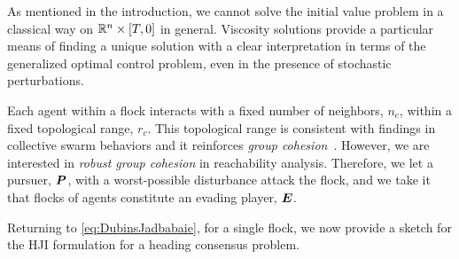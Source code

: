 As mentioned in the introduction, we cannot solve the initial value problem in a classical way on $\mathbb{R}^n \times [T, 0]$ in general. Viscosity solutions provide a particular means of finding a unique solution with a clear interpretation in terms of the generalized optimal control problem, even in the presence of stochastic perturbations. 
%
%

Each agent within a flock interacts with a fixed number of neighbors, $n_c$, within a fixed topological range, $r_c$. This topological range %
is consistent with findings in collective swarm behaviors and it reinforces \textit{group cohesion}~\cite{Ballerini1232}. However, we are interested in \textit{robust group cohesion} in reachability analysis. Therefore, we let a pursuer, $\bm{P}$, with a worst-possible disturbance attack the flock, and we take it that flocks of agents constitute an evading player, $\bm{E}$. 

%
Returning to \eqref{eq:DubinsJadbabaie}, for a single flock, we now provide a sketch for the HJI formulation for a heading consensus problem. 

